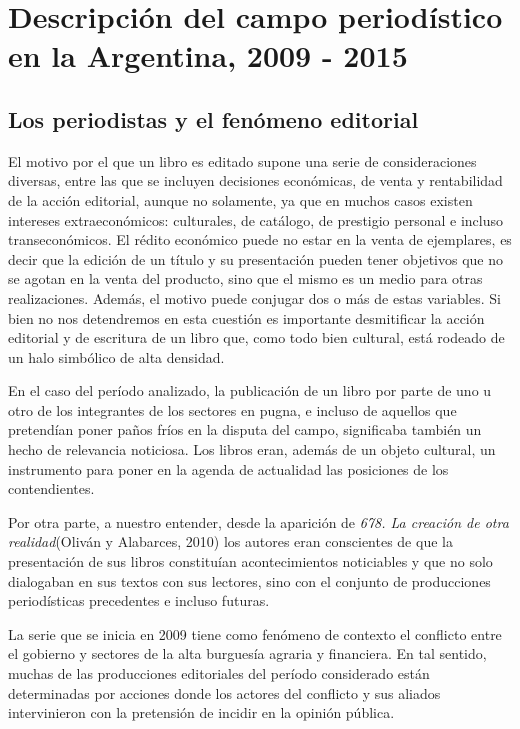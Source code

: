 \chapter {Descripción del campo periodístico en la Argentina, 2009 - 2015}

\section {Los periodistas y el fenómeno editorial}

El motivo por el que un libro es editado supone una serie de consideraciones diversas, entre las que se incluyen decisiones económicas, de venta y rentabilidad de la acción editorial, aunque no solamente, ya que en muchos casos existen intereses extraeconómicos: culturales, de catálogo, de prestigio personal e incluso transeconómicos. El rédito económico puede no estar en la venta de ejemplares, es decir que la edición de un título y su presentación pueden tener objetivos que no se agotan en la venta del producto, sino que el mismo es un medio para otras realizaciones. Además, el motivo puede conjugar dos o más de estas variables. Si bien no nos detendremos en esta cuestión es importante desmitificar la acción editorial y de escritura de un libro que, como todo bien cultural, está rodeado de un halo simbólico de alta densidad.

En el caso del período analizado, la publicación de un libro por parte de uno u otro de los integrantes de los sectores en pugna, e incluso de aquellos que pretendían poner paños fríos en la disputa del campo, significaba también un hecho de relevancia noticiosa. Los libros eran, además de un objeto cultural, un instrumento para poner en la agenda de actualidad las posiciones de los contendientes.

Por otra parte, a nuestro entender, desde la aparición de \emph{678. La creación de otra realidad}(Oliván y Alabarces, 2010) los autores eran conscientes de que la presentación de sus libros constituían acontecimientos noticiables y que no solo dialogaban en sus textos con sus lectores, sino con el conjunto de producciones periodísticas precedentes e incluso futuras.

La serie que se inicia en 2009 tiene como fenómeno de contexto el conflicto entre el gobierno y sectores de la alta burguesía agraria y financiera. En tal sentido, muchas de las producciones editoriales del período considerado están determinadas por acciones donde los actores del conflicto y sus aliados intervinieron con la pretensión de incidir en la opinión pública.

